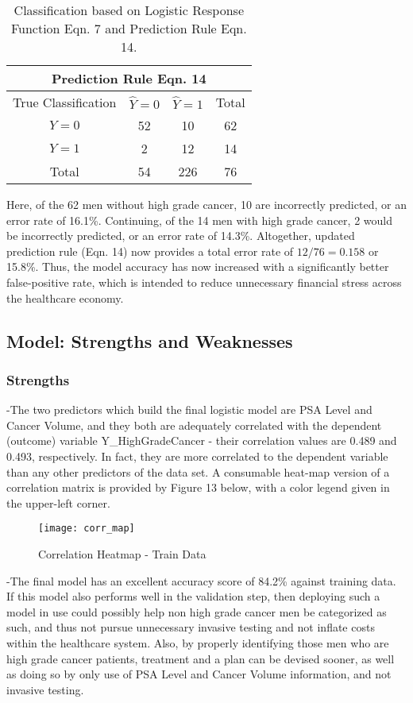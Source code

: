 \begin{table}[H]
	\centering
	\begin{tabular}{ |c||c|c||c| }
 	\hline
 	\multicolumn{4}{|c|}{Prediction Rule Eqn. 14} \\
 	\hline\hline
 	True Classification&\(\hat{Y}=0\)&\(\hat{Y}=1\)&Total\\
 	\hline
 	\(Y=0\)&52&10&62\\
 	\(Y=1\)&2&12&14\\
 	\hline\hline
 	Total&54&226&76\\
 	\hline
	\end{tabular}
 	\caption{Classification based on Logistic Response Function Eqn. 7 and Prediction Rule Eqn. 14.}
\end{table}

Here, of the 62 men without high grade cancer, 10 are incorrectly predicted, or an error rate of 16.1\%. Continuing, of the 14 men with high grade cancer, 2 would be incorrectly predicted, or an error rate of 14.3\%. Altogether, updated prediction rule (Eqn. 14) now provides a total error rate of \(12/76=0.158\) or 15.8\%. Thus, the model accuracy has now increased with a significantly better false-positive rate, which is intended to reduce unnecessary financial stress across the healthcare economy.


\subsection{Model: Strengths and Weaknesses}
\subsubsection{Strengths}
-The two predictors which build the final logistic model are PSA Level and Cancer Volume, and they both are adequately correlated with the dependent (outcome) variable Y\_HighGradeCancer - their correlation values are 0.489 and 0.493, respectively. In fact, they are more correlated to the dependent variable than any other predictors of the data set. A consumable heat-map version of a correlation matrix is provided by Figure 13 below, with a color legend given in the upper-left corner.

\begin{figure}[H]
	\centering
	\texttt{[image: corr\_map]}
	\caption{Correlation Heatmap - Train Data}
\end{figure}

-The final model has an excellent accuracy score of 84.2\% against training data. If this model also performs well in the validation step, then deploying such a model in use could possibly help non high grade cancer men be categorized as such, and thus not pursue unnecessary invasive testing and not inflate costs within the healthcare system. Also, by properly identifying those men who are high grade cancer patients, treatment and a plan can be devised sooner, as well as doing so by only use of PSA Level and Cancer Volume information, and not invasive testing. \\ 

